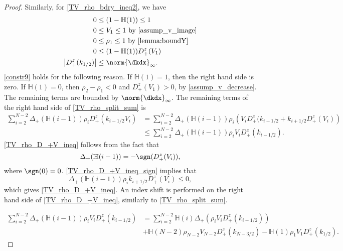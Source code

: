 \begin{proof}
	Similarly, for \eqref{TV_rho_bdry_ineq2}, we have
	\begin{align}
		0 &\leq (1-\mathbb{H}(1)) \leq 1 \label{constr6}\\
		0 &\leq  V_{1} \leq 1 \text{ by } \eqref{assump_v_image} \label{constr7}\\
		0 &\leq  \rho_{1} \leq 1 \text{ by } \eqref{lemma:boundY} \label{constr8}\\ 
		0 &\leq (1-\mathbb{H}(1))D_+^z(V_{1}) \label{constr9}\\ 
		\left|D_+^z(k_{1/2})\right| &\leq \norm{\dkdx}_\infty. \label{constr10} 
	\end{align} 
 	\eqref{constr9} holds for the following reason. If $\mathbb{H}(1) = 1$, then the right hand side is zero. If $\mathbb{H}(1) = 0$, then $\rho_2 - \rho_1 < 0$ and $D_+^z(V_{1}) > 0$, by \eqref{assump_v_decrease}. The remaining terms are bounded by $\norm{\dkdx}_\infty$. The remaining terms of the right hand side of \eqref{TV_rho_split_sum} is
 	\begin{align}
 		\sum_{i = 2}^{N-2} \Delta_+(\mathbb{H}(i-1)) \rho_{i} D_+^z(k_{i-1/2}V_{i}) &= \sum_{i = 2}^{N-2} \Delta_+(\mathbb{H}(i-1)) \rho_{i} \left(V_i D_+^z(k_{i-1/2} + k_{i+1/2}D_+^z(V_{i})\right) \nonumber \\
 		&\leq \sum_{i = 2}^{N-2} \Delta_+(\mathbb{H}(i-1)) \rho_{i} V_i D_+^z(k_{i-1/2}). \label{TV_rho_D_+V_ineq}
 	\end{align}
 	\eqref{TV_rho_D_+V_ineq} follows from the fact that 
 	\begin{equation}
 		\Delta_+(\mathbb{H}(i-1)) = - \sgn(D_+^z(V_{i})), \label{TV_rho_D_+V_ineq_sign}
 	\end{equation}
 	where $\sgn(0) = 0$. \eqref{TV_rho_D_+V_ineq_sign} implies that 
 	\begin{equation}
 		\Delta_+(\mathbb{H}(i-1)) \rho_{i}k_{i+1/2}D_+^z(V_{i}) \leq 0, 
 	\end{equation}
 	which gives \eqref{TV_rho_D_+V_ineq}. An index shift is performed on the right hand side of \eqref{TV_rho_D_+V_ineq}, similarly to \eqref{TV_rho_split_sum}. 
 	
 	\begin{align}
 		\sum_{i = 2}^{N-2} \Delta_+(\mathbb{H}(i-1)) \rho_{i} V_i D_+^z(k_{i-1/2}) &= \sum_{i = 2}^{N-2} \mathbb{H}(i) \Delta_+(\rho_{i} V_i D_+^z(k_{i-1/2})) \\
 		&+ \mathbb{H}(N-2) \rho_{N-2} V_{N-2} D_+^z(k_{N-3/2}) - \mathbb{H}(1) \rho_{1} V_{1} D_+^z(k_{1/2}). \label{TV_rho_split_sum_2}
 	\end{align}
 

\end{proof}
